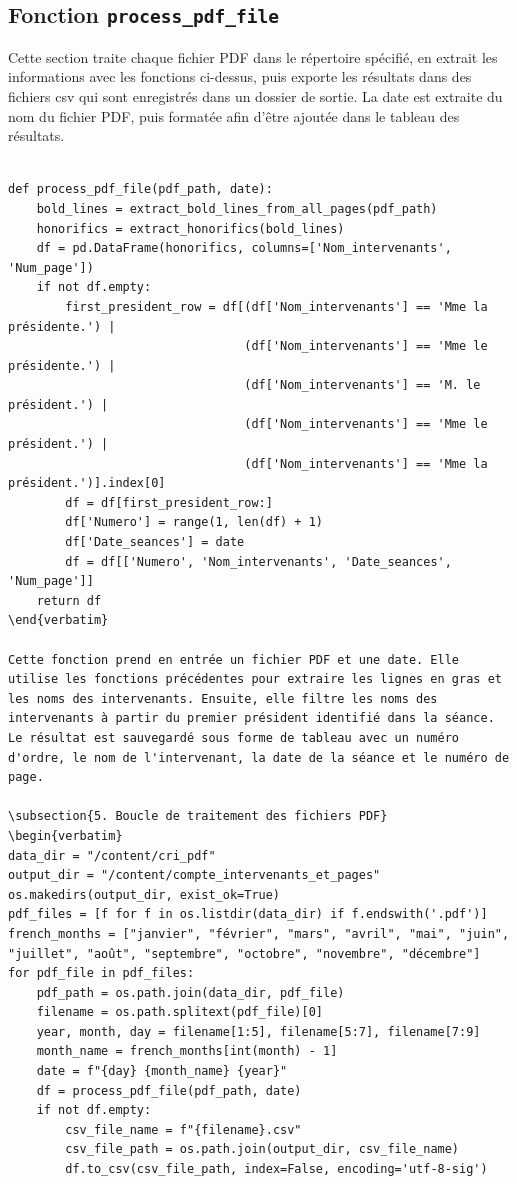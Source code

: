 \subsection{Fonction \texttt{process\_pdf\_file}}
Cette section traite chaque fichier \gls{PDF} dans le répertoire spécifié, en extrait les informations avec les fonctions ci-dessus, puis exporte les résultats dans des fichiers \gls{csv} qui sont enregistrés dans un dossier de sortie. La date est extraite du nom du fichier \gls{PDF}, puis formatée afin d'être ajoutée dans le tableau des résultats.
\begin{lstlisting}

def process_pdf_file(pdf_path, date):
    bold_lines = extract_bold_lines_from_all_pages(pdf_path)
    honorifics = extract_honorifics(bold_lines)
    df = pd.DataFrame(honorifics, columns=['Nom_intervenants', 'Num_page'])
    if not df.empty:
        first_president_row = df[(df['Nom_intervenants'] == 'Mme la présidente.') |
                                 (df['Nom_intervenants'] == 'Mme le présidente.') |
                                 (df['Nom_intervenants'] == 'M. le président.') |
                                 (df['Nom_intervenants'] == 'Mme le président.') |
                                 (df['Nom_intervenants'] == 'Mme la président.')].index[0]
        df = df[first_president_row:]
        df['Numero'] = range(1, len(df) + 1)
        df['Date_seances'] = date
        df = df[['Numero', 'Nom_intervenants', 'Date_seances', 'Num_page']]
    return df
\end{verbatim}

Cette fonction prend en entrée un fichier PDF et une date. Elle utilise les fonctions précédentes pour extraire les lignes en gras et les noms des intervenants. Ensuite, elle filtre les noms des intervenants à partir du premier président identifié dans la séance. 
Le résultat est sauvegardé sous forme de tableau avec un numéro d'ordre, le nom de l'intervenant, la date de la séance et le numéro de page.

\subsection{5. Boucle de traitement des fichiers PDF}
\begin{verbatim}
data_dir = "/content/cri_pdf"
output_dir = "/content/compte_intervenants_et_pages"
os.makedirs(output_dir, exist_ok=True)
pdf_files = [f for f in os.listdir(data_dir) if f.endswith('.pdf')]
french_months = ["janvier", "février", "mars", "avril", "mai", "juin", "juillet", "août", "septembre", "octobre", "novembre", "décembre"]
for pdf_file in pdf_files:
    pdf_path = os.path.join(data_dir, pdf_file)
    filename = os.path.splitext(pdf_file)[0]
    year, month, day = filename[1:5], filename[5:7], filename[7:9]
    month_name = french_months[int(month) - 1]
    date = f"{day} {month_name} {year}"
    df = process_pdf_file(pdf_path, date)
    if not df.empty:
        csv_file_name = f"{filename}.csv"
        csv_file_path = os.path.join(output_dir, csv_file_name)
        df.to_csv(csv_file_path, index=False, encoding='utf-8-sig')
\end{lstlisting}
